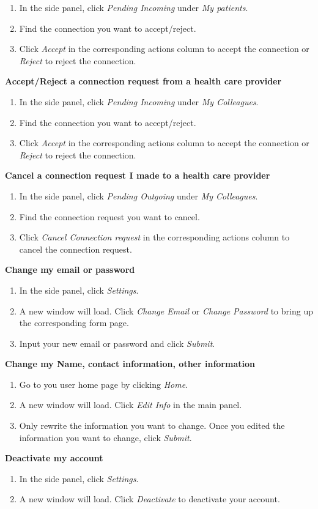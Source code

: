 \documentclass[12pt]{report}
\begin{document}
\begin{enumerate}
\item In the side panel, click \textit{Pending Incoming} under \textit{My patients}.
\item Find the connection you want to accept/reject.
\item Click \textit{Accept} in the corresponding actions column to accept the connection or \textit{Reject} to reject the connection.
\end{enumerate}
\textbf{Accept/Reject a connection request from a health care provider}
\begin{enumerate}
\item In the side panel, click \textit{Pending Incoming} under \textit{My Colleagues}.
\item Find the connection you want to accept/reject.
\item Click \textit{Accept} in the corresponding actions column to accept the connection or \textit{Reject} to reject the connection.
\end{enumerate}
\textbf{Cancel a connection request I made to a health care provider}
\begin{enumerate}
\item In the side panel, click \textit{Pending Outgoing} under \textit{My Colleagues}.
\item Find the connection request you want to cancel.
\item Click \textit{Cancel Connection request} in the corresponding actions column to cancel the connection request.
\end{enumerate}
\textbf{Change my email or password}
\begin{enumerate}
\item In the side panel, click \textit{Settings}.
\item A new window will load. Click \textit{Change Email} or \textit{Change Password} to bring up the corresponding form page.
\item Input your new email or password and click \textit{Submit}.
\end{enumerate}
\textbf{Change my Name, contact information, other information}
\begin{enumerate}
\item Go to you user home page by clicking \textit{Home}.
\item A new window will load. Click \textit{Edit Info} in the main panel.
\item Only rewrite the information you want to change. Once you edited the information you want to change, click \textit{Submit}.
\end{enumerate}
\textbf{Deactivate my account}
\begin{enumerate}
\item In the side panel, click \textit{Settings}.
\item A new window will load. Click \textit{Deactivate} to deactivate your account.
\end{enumerate}
\end{document}
